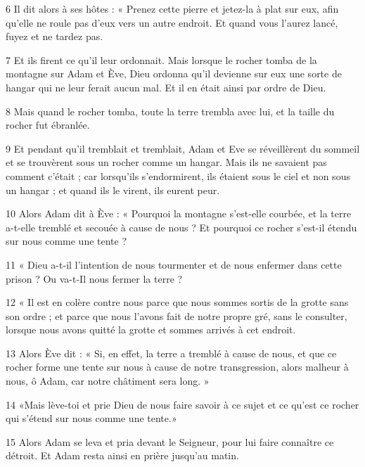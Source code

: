 \par 6 Il dit alors à ses hôtes : « Prenez cette pierre et jetez-la à plat sur eux, afin qu'elle ne roule pas d'eux vers un autre endroit. Et quand vous l’aurez lancé, fuyez et ne tardez pas.

\par 7 Et ils firent ce qu'il leur ordonnait. Mais lorsque le rocher tomba de la montagne sur Adam et Ève, Dieu ordonna qu'il devienne sur eux une sorte de hangar qui ne leur ferait aucun mal. Et il en était ainsi par ordre de Dieu.

\par 8 Mais quand le rocher tomba, toute la terre trembla avec lui, et la taille du rocher fut ébranlée.

\par 9 Et pendant qu'il tremblait et tremblait, Adam et Eve se réveillèrent du sommeil et se trouvèrent sous un rocher comme un hangar. Mais ils ne savaient pas comment c’était ; car lorsqu'ils s'endormirent, ils étaient sous le ciel et non sous un hangar ; et quand ils le virent, ils eurent peur.

\par 10 Alors Adam dit à Ève : « Pourquoi la montagne s'est-elle courbée, et la terre a-t-elle tremblé et secouée à cause de nous ? Et pourquoi ce rocher s’est-il étendu sur nous comme une tente ?

\par 11 « Dieu a-t-il l'intention de nous tourmenter et de nous enfermer dans cette prison ? Ou va-t-Il nous fermer la terre ?

\par 12 « Il est en colère contre nous parce que nous sommes sortis de la grotte sans son ordre ; et parce que nous l'avons fait de notre propre gré, sans le consulter, lorsque nous avons quitté la grotte et sommes arrivés à cet endroit.

\par 13 Alors Ève dit : « Si, en effet, la terre a tremblé à cause de nous, et que ce rocher forme une tente sur nous à cause de notre transgression, alors malheur à nous, ô Adam, car notre châtiment sera long. »

\par 14 «Mais lève-toi et prie Dieu de nous faire savoir à ce sujet et ce qu'est ce rocher qui s'étend sur nous comme une tente.»

\par 15 Alors Adam se leva et pria devant le Seigneur, pour lui faire connaître ce détroit. Et Adam resta ainsi en prière jusqu'au matin.

